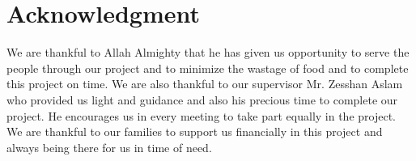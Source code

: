 \chapter*{Acknowledgment}

We are thankful to Allah Almighty that he has given us opportunity to serve the people through our project and to minimize the wastage of food and to complete this project on time. We are also thankful to our supervisor Mr. Zesshan Aslam who provided us light and guidance and also his precious time to complete our project. He encourages us in every meeting to take part equally in the project. We are thankful to our families to support us financially in this project and always being there for us in time of need.

\vspace{10mm}



\\

